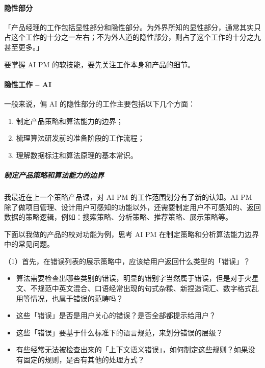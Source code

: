 \documentclass[letterpaper,11pt,english]{sphinxmanual}
\begin{document}
\paragraph{隐性部分}
\label{\detokenize{chapter_experience/recessive_work:id2}}
「产品经理的工作包括显性部分和隐性部分。为外界所知的显性部分，通常其实只占这个工作的十分之一左右；不为外人道的隐性部分，则占了这个工作的十分之九甚至更多。」

要掌握 AI PM 的软技能，要先关注工作本身和产品的细节。
%
\begin{footnote}[630]\sphinxAtStartFootnote
{}
%
\end{footnote}


\paragraph{隐性工作 – AI}
\label{\detokenize{chapter_experience/recessive_work:ai}}
一般来说，偏 AI 的隐性部分的工作主要包括以下几个方面：
\begin{enumerate}
%
\item {} 
制定产品策略和算法能力的边界；

\item {} 
梳理算法研发前的准备阶段的工作流程；

\item {} 
理解数据标注和算法原理的基本常识。

\end{enumerate}


\subparagraph{制定产品策略和算法能力的边界}
\label{\detokenize{chapter_experience/recessive_work:id3}}
我最近在上一个策略产品课，对 AI PM 的工作范围划分有了新的认知。AI PM
除了做项目管理、设计用户可感知的功能以外，还需要制定用户不可感知的、返回数据的策略逻辑，例如：搜索策略、分析策略、推荐策略、展示策略等。

下面以我做的产品的校对功能为例，思考 AI PM
在制定策略和分析算法能力边界中的常见问题。

（1）首先，在错误列表的展示策略中，应该给用户返回什么类型的「错误」？
\begin{itemize}
\item {} 
算法需要检查出哪些类别的错误，明显的错别字当然属于错误，但是对于火星文、不规范中英文混合、口语经常出现的句式杂糅、新捏造词汇、数字格式乱用等情况，也属于错误的范畴吗？

\item {} 
这些「错误」是否是用户关心的错误？是否全部都提示给用户？

\item {} 
这些「错误」要基于什么标准下的语言规范，来划分错误的层级？

\item {} 
有些经常无法被检查出来的「上下文语义错误」，如何制定这些规则？如果没有固定的规则，是否有其他的处理方式？

\end{itemize}
\end{document}
